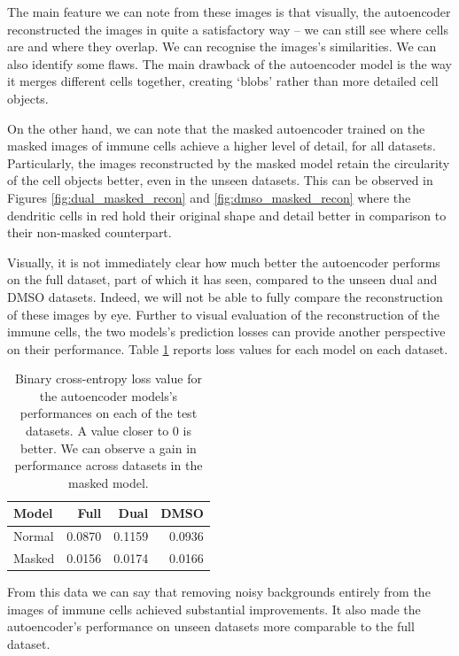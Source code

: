 The main feature we can note from these images is that visually, the autoencoder reconstructed the images in quite a satisfactory way – we can still see where cells are and where they overlap. We can recognise the images's similarities. We can also identify some flaws. The main drawback of the autoencoder model is the way it merges different cells together, creating `blobs' rather than more detailed cell objects.

On the other hand, we can note that the masked autoencoder trained on the masked images of immune cells achieve a higher level of detail, for all datasets. Particularly, the images reconstructed by the masked model retain the circularity of the cell objects better, even in the unseen datasets. This can be observed in Figures \ref{fig:dual_masked_recon} and \ref{fig:dmso_masked_recon} where the dendritic cells in red hold their original shape and detail better in comparison to their non-masked counterpart.

Visually, it is not immediately clear how much better the autoencoder performs on the full dataset, part of which it has seen, compared to the unseen dual and DMSO datasets. Indeed, we will not be able to fully compare the reconstruction of these images by eye. Further to visual evaluation of the reconstruction of the immune cells, the two models's prediction losses can provide another perspective on their performance. Table \ref{tab:autoencoder_loss} reports loss values for each model on each dataset.

\begin{table}[!h]
\centering
\caption{Binary cross-entropy loss value for the autoencoder models's performances on each of the test datasets. A value closer to 0 is better. We can observe a gain in performance across datasets in the masked model.}
\label{tab:autoencoder_loss}
\begin{tabular}{l|r|r|r}
\rowcolor[HTML]{EFEFEF} 
Model  & Full   & Dual   & DMSO   \\ \hline
Normal & 0.0870 & 0.1159 & 0.0936 \\ \hline
Masked & 0.0156 & 0.0174 & 0.0166 \\
\end{tabular}
\end{table}

From this data we can say that removing noisy backgrounds entirely from the images of immune cells achieved substantial improvements. It also made the autoencoder's performance on unseen datasets more comparable to the full dataset.

